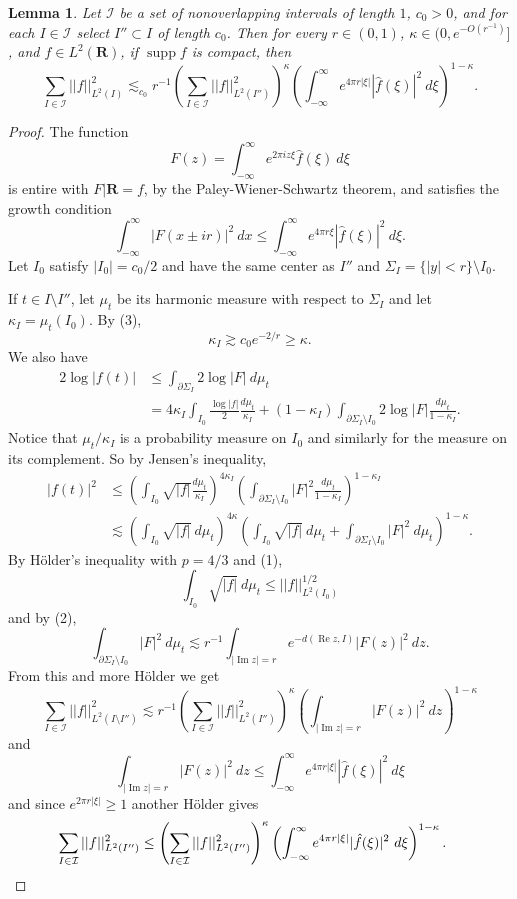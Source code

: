 \documentclass[reqno,12pt,letterpaper]{amsart}
\newcommand{\RR}{\mathbf{R}}
\DeclareMathOperator{\supp}{supp}
\renewcommand{\Re}{\operatorname{Re}}
\renewcommand{\Im}{\operatorname{Im}}
\newtheorem{lemma}[theorem]{Lemma}
\theoremstyle{definition}
\numberwithin{equation}{section}
\begin{document}
\begin{lemma}
Let $\mathcal I$ be a set of nonoverlapping intervals of length $1$, $c_0 > 0$, and for each $I \in \mathcal I$ select $I'' \subset I$ of length $c_0$.
Then for every $r \in (0, 1)$, $\kappa \in (0, e^{-O(r^{-1})}]$, and $f \in L^2(\RR)$, if $\supp f$ is compact, then
$$\sum_{I \in \mathcal I} ||f||_{L^2(I)}^2 \lesssim_{c_0} r^{-1} \left(\sum_{I \in \mathcal I} ||f||_{L^2(I'')}^2 \right)^\kappa \left(\int_{-\infty}^\infty e^{4\pi r|\xi|} |\hat f(\xi)|^2 ~d\xi \right)^{1 - \kappa}.$$
\end{lemma}
\begin{proof}
The function
$$F(z) = \int_{-\infty}^\infty e^{2\pi iz\xi} \hat f(\xi) ~d\xi$$
is entire with $F|\RR = f$, by the Paley-Wiener-Schwartz theorem, and satisfies the growth condition
$$\int_{-\infty}^\infty |F(x \pm ir)|^2 ~dx \leq \int_{-\infty}^\infty e^{4\pi r\xi} |\hat f(\xi)|^2 ~d\xi.$$
Let $I_0$ satisfy $|I_0| = c_0/2$ and have the same center as $I''$ and $\Sigma_I = \{|y| < r\} \setminus I_0$.

If $t \in I \setminus I''$, let $\mu_t$ be its harmonic measure with respect to $\Sigma_I$ and let $\kappa_I = \mu_t(I_0)$.
By (3),
$$\kappa_I \gtrsim c_0 e^{-2/r} \geq \kappa.$$
We also have
\begin{align*}
2 \log |f(t)| &\leq \int_{\partial \Sigma_I} 2 \log |F| ~d\mu_t \\
&= 4\kappa_I \int_{I_0} \frac{\log |f|}{2} \frac{d\mu_t}{\kappa_I} + (1 - \kappa_I) \int_{\partial \Sigma_I \setminus I_0} 2 \log |F| \frac{d\mu_t}{1 - \kappa_I}.
\end{align*}
Notice that $\mu_t/\kappa_I$ is a probability measure on $I_0$ and similarly for the measure on its complement.
So by Jensen's inequality,
\begin{align*}
|f(t)|^2 &\leq \left(\int_{I_0} \sqrt{|f|} \frac{d\mu_t}{\kappa_I}\right)^{4\kappa_I} \left(\int_{\partial \Sigma_I \setminus I_0} |F|^2 \frac{d\mu_t}{1 - \kappa_I}\right)^{1 - \kappa_I}\\
&\lesssim \left(\int_{I_0} \sqrt{|f|} ~d\mu_t\right)^{4\kappa}\left(\int_{I_0} \sqrt{|f|} ~d\mu_t + \int_{\partial \Sigma_I \setminus I_0} |F|^2 ~d\mu_t\right)^{1 - \kappa}.
\end{align*}
By H\"older's inequality with $p = 4/3$ and (1),
$$\int_{I_0} \sqrt{|f|} ~d\mu_t \leq ||f||_{L^2(I_0)}^{1/2}$$
and by (2),
$$\int_{\partial \Sigma_I \setminus I_0} |F|^2 ~d\mu_t \lesssim r^{-1} \int_{|\Im z| = r} e^{-d(\Re z, I)} |F(z)|^2 ~dz.$$
From this and more H\"older we get
$$\sum_{I \in \mathcal I} ||f||_{L^2(I \setminus I'')}^2 \lesssim r^{-1} \left(\sum_{I \in \mathcal I} ||f||_{L^2(I'')}^2\right)^\kappa \left(\int_{|\Im z| = r} |F(z)|^2 ~dz\right)^{1 - \kappa}$$
and
$$\int_{|\Im z| = r} |F(z)|^2 ~dz \leq \int_{-\infty}^\infty e^{4\pi r|\xi|} |\hat f(\xi)|^2 ~d\xi$$
and since $e^{2\pi r|\xi|} \geq 1$ another H\"older gives
\begin{align*}
\sum_{I \in \mathcal I} ||f||_{L^2(I'')}^2 &\leq \left(\sum_{I \in \mathcal I} ||f||_{L^2(I'')}^2\right)^\kappa \left(\int_{-\infty}^\infty e^{4\pi r|\xi|} |\hat f(\xi)|^2 ~d\xi \right)^{1 - \kappa}.
\qedhere \end{align*}
\end{proof}
\end{document}

